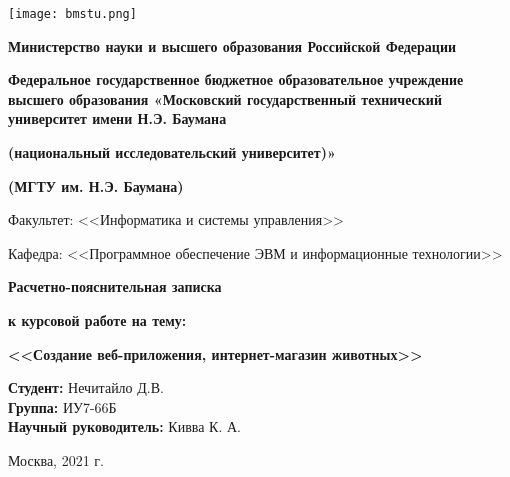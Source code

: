 \documentclass[a4paper, 14pt]{extreport}
\begin{document}
\def\figurename{Рисунок}
 	
 	\begin{minipage}{0.2\textwidth}
 		\texttt{[image: bmstu.png]}
 	\end{minipage}
 	\begin{minipage}{0.7\textwidth}
 		\small
 		\begin{center}
 			\textbf{Министерство науки и высшего образования Российской Федерации}
 			
 			\textbf{Федеральное государственное бюджетное образовательное учреждение высшего образования «Московский государственный технический университет имени Н.Э. Баумана}
 			
 			\textbf{(национальный исследовательский университет)»}
 			
 			\textbf{(МГТУ им. Н.Э. Баумана)}
 		\end{center}
 	\end{minipage}
 	
 	\vspace*{5mm}
 	
 	\normalsize
 	\begin{flushleft}
 		Факультет: <<Информатика и системы управления>>
 		
 		Кафедра: <<Программное обеспечение ЭВМ и информационные технологии>>
 	\end{flushleft}
 	
 	\vspace*{20mm}
 	
 	\LARGE
 	\begin{center}
 		\textbf{Расчетно-пояснительная записка}
 		
 		\textbf{к курсовой работе на тему:}
 		
 		\textbf{<<Создание веб-приложения, интернет-магазин животных>>}
 	\end{center}
 	
 	\vspace*{15mm}
 	
 	\large
 	\begin{flushleft}
 		\textbf{Студент:} Нечитайло Д.В. \\
 		\textbf{Группа:} ИУ7-66Б \\
 		\textbf{Научный руководитель:} Кивва К. А.
 	\end{flushleft}
 	
 	\vspace*{30mm}
 	
 	\large
 	\begin{center}
 		Москва, 2021 г.
 	\end{center}
 	
 	\thispagestyle{empty}
 	
 	\newpage

    \tableofcontents
    
    
    
    
    
\end{document}
